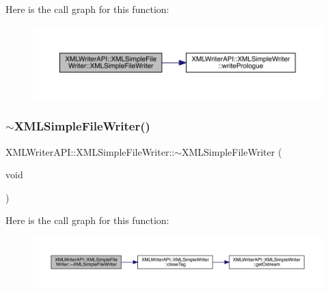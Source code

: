 Here is the call graph for this function\+:
\nopagebreak
\begin{figure}[H]
\begin{center}
\leavevmode
\includegraphics[width=350pt]{d2/de2/classXMLWriterAPI_1_1XMLSimpleFileWriter_a8ce4f6691f7e2e803a14e0cba906a4b7_cgraph}
\end{center}
\end{figure}
\mbox{\label{classXMLWriterAPI_1_1XMLSimpleFileWriter_a8a18cf3ea74f63a4f84a434237109e68}} 
\subsubsection{\texorpdfstring{$\sim$XMLSimpleFileWriter()}{~XMLSimpleFileWriter()}\hspace{0.1cm}{\footnotesize\ttfamily [3/3]}}
{\footnotesize\ttfamily X\+M\+L\+Writer\+A\+P\+I\+::\+X\+M\+L\+Simple\+File\+Writer\+::$\sim$\+X\+M\+L\+Simple\+File\+Writer (\begin{DoxyParamCaption}\item[{void}]{ }\end{DoxyParamCaption})\hspace{0.3cm}{\ttfamily [inline]}}

Here is the call graph for this function\+:
\nopagebreak
\begin{figure}[H]
\begin{center}
\leavevmode
\includegraphics[width=350pt]{d2/de2/classXMLWriterAPI_1_1XMLSimpleFileWriter_a8a18cf3ea74f63a4f84a434237109e68_cgraph}
\end{center}
\end{figure}



